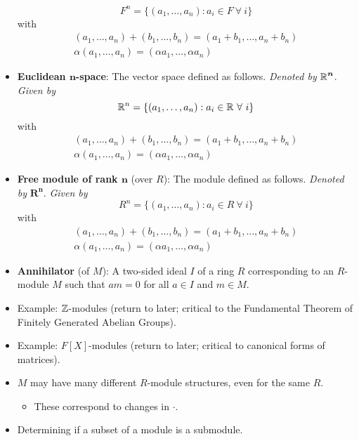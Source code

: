 \documentclass[../notes.tex]{subfiles}
\begin{document}
\begin{itemize}
\begin{equation*}
        F^n = \{(a_1,\dots,a_n):a_i\in F\ \forall\ i\}
    \end{equation*}
    with
    \begin{gather*}
        (a_1,\dots,a_n)+(b_1,\dots,b_n) = (a_1+b_1,\dots,a_n+b_n)\\
        \alpha(a_1,\dots,a_n) = (\alpha a_1,\dots,\alpha a_n)
    \end{gather*}
    \item \textbf{Euclidean $\bm{n}$-space}: The vector space defined as follows. \emph{Denoted by} $\bm{\mathbb{R}^n}$. \emph{Given by}
    \begin{equation*}
        \R^n = \{(a_1,\dots,a_n):a_i\in\R\ \forall\ i\}
    \end{equation*}
    with
    \begin{gather*}
        (a_1,\dots,a_n)+(b_1,\dots,b_n) = (a_1+b_1,\dots,a_n+b_n)\\
        \alpha(a_1,\dots,a_n) = (\alpha a_1,\dots,\alpha a_n)
    \end{gather*}
    \item \textbf{Free module of rank $\bm{n}$} (over $R$): The module defined as follows. \emph{Denoted by} $\bm{R^n}$. \emph{Given by}
    \begin{equation*}
        R^n = \{(a_1,\dots,a_n):a_i\in R\ \forall\ i\}
    \end{equation*}
    with
    \begin{gather*}
        (a_1,\dots,a_n)+(b_1,\dots,b_n) = (a_1+b_1,\dots,a_n+b_n)\\
        \alpha(a_1,\dots,a_n) = (\alpha a_1,\dots,\alpha a_n)
    \end{gather*}
    \item \textbf{Annihilator} (of $M$): A two-sided ideal $I$ of a ring $R$ corresponding to an $R$-module $M$ such that $am=0$ for all $a\in I$ and $m\in M$.
    \item Example: $\mathbb{Z}$-modules (return to later; critical to the Fundamental Theorem of Finitely Generated Abelian Groups).
    \item Example: $F[X]$-modules (return to later; critical to canonical forms of matrices).
    \item $M$ may have many different $R$-module structures, even for the same $R$.
    \begin{itemize}
        \item These correspond to changes in $\cdot$.
    \end{itemize}
    \item Determining if a subset of a module is a submodule.

\end{itemize}
\end{document}
